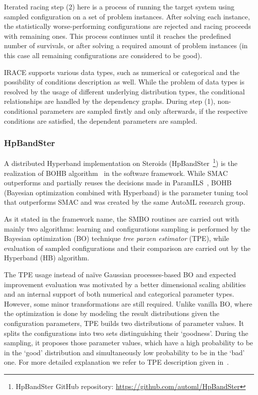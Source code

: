 Iterated racing step (2) here is a process of running the target system using sampled configuration on a set of problem instances. After solving each instance, the statistically worse-performing configurations are rejected and racing proceeds with remaining ones. This process continues until it reaches the predefined number of survivals, or after solving a required amount of problem instances (in this case all remaining configurations are considered to be good). 

IRACE supports various data types, such as numerical or categorical and the possibility of conditions description as well. While the problem of data types is resolved by the usage of different underlying distribution types, the conditional relationships are handled by the dependency graphs. During step (1), non-conditional parameters are sampled firstly and only afterwards, if the respective conditions are satisfied, the dependent parameters are sampled.


\subsubsection{HpBandSter}\label{bg: bohb}
A distributed Hyperband implementation on Steroids (HpBandSter~\footnote{HpBandSter GitHub repository: \url{https://github.com/automl/HpBandSter}}) is the realization of BOHB algorithm~\cite{falkner2018bohb} in the software framework.
While SMAC outperforms and partially reuses the decisions made in ParamILS~\cite{hutter2009paramils}, BOHB (Bayesian optimization combined with Hyperband) is the parameter tuning tool that outperforms SMAC and was created by the same AutoML research group.

As it stated in the framework name, the SMBO routines are carried out with mainly two algorithms: learning and configurations sampling is performed by the Bayesian optimization (BO) technique \emph{tree parzen estimator} (TPE), while evaluation of sampled configurations and their comparison are carried out by the Hyperband (HB) algorithm.

The TPE usage instead of na\"ive Gaussian processes-based BO and expected improvement evaluation was motivated by a better dimensional scaling abilities and an internal support of both numerical and categorical parameter types. However, some minor transformations are still required.
Unlike vanilla BO, where the optimization is done by modeling the result distributions given the configuration parameters, TPE builds two distributions of parameter values. It splits the configurations into two sets distinguishing their `goodness'. During the sampling, it proposes those parameter values, which have a high probability to be in the `good' distribution and simultaneously low probability to be in the `bad' one. For more detailed explanation we refer to TPE description given in~\cite{bergstra2011algorithms}.

